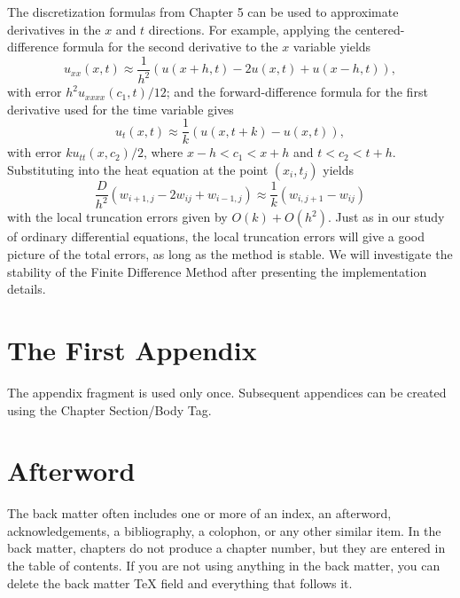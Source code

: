 \documentclass{book}%
\begin{document}
The discretization formulas from Chapter 5 can be used to approximate
derivatives in the $x$ and $t$ directions. For example, applying the
centered-difference formula for the second derivative to the $x$ variable
yields
\begin{equation}
u_{xx}(x,t)\approx\frac{1}{h^{2}}\left(  u(x+h,t)-2u(x,t)+u(x-h,t)\right)
,\label{ec8.4}%
\end{equation}
with error $h^{2}u_{xxxx}(c_{1},t)/12$; and the forward-difference formula for
the first derivative used for the time variable gives%
\begin{equation}
u_{t}(x,t)\approx\frac{1}{k}\left(  u(x,t+k)-u(x,t)\right)  ,\label{ec8.5}%
\end{equation}
with error $ku_{tt}(x,c_{2})/2$, where $x-h<c_{1}<x+h$ and $t<c_{2}<t+h$.
Substituting into the heat equation at the point $(x_{i},t_{j})$ yields%
\begin{equation}
\frac{D}{h^{2}}\left(  w_{i+1,j}-2w_{ij}+w_{i-1,j}\right)  \approx\frac{1}%
{k}\left(  w_{i,j+1}-w_{ij}\right)  \label{ec8.6}%
\end{equation}
with the local truncation errors given by $O(k)+O(h^{2})$. Just as in our
study of ordinary differential equations, the local truncation errors will
give a good picture of the total errors, as long as the method is stable. We
will investigate the stability of the Finite Difference Method after
presenting the implementation details.

\appendix


\chapter{The First Appendix}

The appendix fragment is used only once. Subsequent appendices can be created
using the Chapter Section/Body Tag.

\backmatter


\chapter{Afterword}

The back matter often includes one or more of an index, an afterword,
acknowledgements, a bibliography, a colophon, or any other similar item. In
the back matter, chapters do not produce a chapter number, but they are
entered in the table of contents. If you are not using anything in the back
matter, you can delete the back matter TeX field and everything that follows it.
\end{document}
